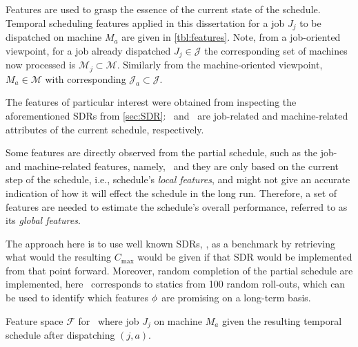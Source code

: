 Features are used to grasp the essence of the current state of the schedule. Temporal scheduling features applied in this dissertation for a job $J_j$ to be dispatched on machine $M_a$ are given in \cref{tbl:features}. 
Note, from a job-oriented viewpoint, for a job already dispatched $J_j\in\mathcal{J}$ the corresponding set of machines now processed is $\mathcal{M}_j\subset\mathcal{M}$. Similarly from the machine-oriented viewpoint, $M_a\in\mathcal{M}$ with corresponding $\mathcal{J}_a\subset\mathcal{J}$. 

The features of particular interest were obtained from inspecting the aforementioned SDRs from \cref{sec:SDR}:  
\phiJobRelated\ and \phiMacRelated\ are job-related and machine-related attributes of the current schedule, respectively. 

Some features are directly observed from the partial schedule, such as the job- 
and machine-related features, namely, \phiLocalRelated\ and they are only based 
on the current step of the schedule, 
i.e., schedule's \emph{local features}, and might not give an accurate 
indication of how it will effect the schedule in the long run. Therefore, a set 
of features are needed to estimate the schedule's overall performance, referred 
to as its \emph{global features}. 

The approach here is to use well known SDRs, \phiSDRRelated, as a benchmark by 
retrieving what would the resulting $C_{\max}$ would be given if that SDR would 
be implemented from that point forward. 
Moreover, random completion of the partial schedule are implemented, 
here \phiRNDRelated\ corresponds to statics from 100 random roll-outs, which 
can be used to identify which features ${\mathbf{\phi}}$ are promising on a long-term 
basis.  


\begin{table} \centering 
	\caption[Feature space $\mathcal{F}$ for \JSP]{Feature space $\mathcal{F}$ for \JSP\ where job $J_j$ on machine $M_a$ given the resulting temporal schedule after dispatching $(j,a)$.}
	\label{tbl:features}
	
\end{table}


